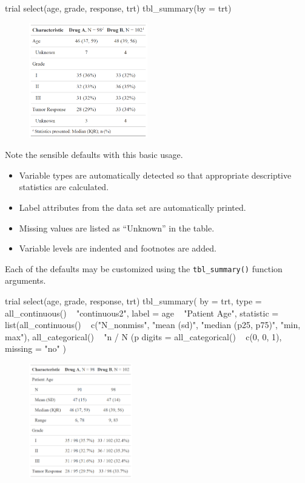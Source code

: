 \begin{example}
trial %
  select(age, grade, response, trt) %
  tbl_summary(by = trt)
\end{example}
\begin{figure}[h!]
  \includegraphics[height=5cm]{summary_basic.png}
  \centering
\end{figure}

Note the sensible defaults with this basic usage.

\begin{itemize}
\item Variable types are automatically detected so that appropriate descriptive statistics are calculated.
\item Label attributes from the data set are automatically printed.
\item Missing values are listed as “Unknown” in the table.
\item Variable levels are indented and footnotes are added.
\end{itemize}

Each of the defaults may be customized using the \texttt{tbl\_summary()} function arguments.


\begin{example}
trial %
  select(age, grade, response, trt) %
  tbl_summary(
    by = trt,
    type = all_continuous() ~ "continuous2",
    label = age ~ "Patient Age",
    statistic = list(all_continuous() ~ c("{N_nonmiss}", 
                                          "{mean} ({sd})", 
                                          "{median} ({p25}, {p75})", 
                                          "{min}, {max}"),
                     all_categorical() ~ "{n} / {N} ({p}%
    digits = all_categorical() ~ c(0, 0, 1),
    missing = "no"
  )
\end{example}
\begin{figure}[h!]
  \includegraphics[height=5cm]{summary_plus.png}
  \centering
\end{figure}

